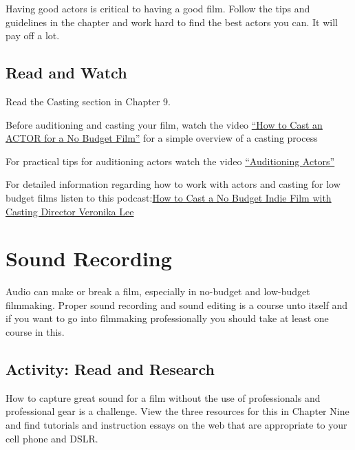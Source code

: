 \documentclass[
]{book}
\begin{document}
Having good actors is critical to having a good film. Follow the tips and guidelines in the chapter and work hard to find the best actors you can. It will pay off a lot.

\hypertarget{read-and-watch}{%
\subsection*{Read and Watch}\label{read-and-watch}}

\begin{reflect}
Read the Casting section in Chapter 9.

Before auditioning and casting your film, watch the video \href{https://www.youtube.com/watch?v=YpCkRPqsiJ4}{``How to Cast an ACTOR for a No Budget Film''} for a simple overview of a casting process

For practical tips for auditioning actors watch the video \href{https://www.youtube.com/watch?v=x0G6n346m90}{``Auditioning Actors''}

For detailed information regarding how to work with actors and casting for low budget films listen to this podcast:\href{https://www.youtube.com/watch?v=-DwKilT0T34}{How to Cast a No Budget Indie Film with Casting Director Veronika Lee}
\end{reflect}

\hypertarget{sound-recording}{%
\section{Sound Recording}\label{sound-recording}}

Audio can make or break a film, especially in no-budget and low-budget filmmaking. Proper sound recording and sound editing is a course unto itself and if you want to go into filmmaking professionally you should take at least one course in this.

\hypertarget{activity-read-and-research}{%
\subsection*{Activity: Read and Research}\label{activity-read-and-research}}

\begin{reflect}
How to capture great sound for a film without the use of professionals and professional gear is a challenge. View the three resources for this in Chapter Nine and find tutorials and instruction essays on the web that are appropriate to your cell phone and DSLR.
\end{reflect}
\end{document}
